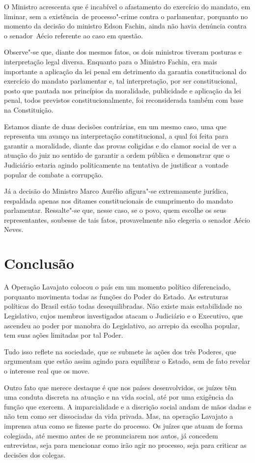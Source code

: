 O Ministro acrescenta que é incabível o afastamento do exercício do
mandato, em liminar, sem a existência~de processo"-crime contra o
parlamentar, porquanto no momento da decisão do ministro Edson Fachin,
ainda não havia denúncia contra o senador~Aécio referente ao caso em
questão.

Observe"-se que, diante dos mesmos fatos, os dois ministros tiveram
posturas e interpretação legal diversa. Enquanto para o Ministro Fachin,
era mais importante a aplicação da lei penal em detrimento da garantia
constitucional do exercício do mandato parlamentar e, tal interpretação,
por ser constitucional, posto que pautada nos princípios da moralidade,
publicidade e aplicação da lei penal, todos previstos
constitucionalmente, foi reconsiderada também com base na Constituição.

Estamos diante de duas decisões contrárias, em um mesmo caso, uma que
representa um avanço na interpretação constitucional, a qual foi feita
para garantir a moralidade, diante das provas coligidas e do clamor
social de ver a atuação do juiz no sentido de garantir a ordem pública e
demonstrar que o Judiciário estaria agindo politicamente na tentativa de
justificar a vontade popular de combate a corrupção.

Já a decisão do Ministro Marco Aurélio afigura"-se extremamente jurídica,
respaldada apenas nos ditames constitucionais de cumprimento do mandato
parlamentar. Ressalte"-se que, nesse caso, se o povo, quem escolhe os
seus representantes, soubesse de tais fatos, provavelmente não elegeria
o senador Aécio Neves.

\section{Conclusão}

A Operação Lavajato colocou o país em um momento político diferenciado,
porquanto movimenta todas as funções do Poder do Estado. As estruturas
políticas do Brasil estão todas desequilibradas. Não existe mais
estabilidade no Legislativo, cujos membros investigados atacam o
Judiciário e o Executivo, que ascendeu ao poder por manobra do
Legislativo, ao arrepio da escolha popular, tem suas ações limitadas por
tal Poder.

Tudo isso reflete na sociedade, que se submete às ações dos três
Poderes, que argumentam que estão assim agindo para equilibrar o Estado,
sem de fato revelar o interesse real que os move.

Outro fato que merece destaque é que nos países desenvolvidos, os juízes
têm uma conduta discreta na atuação e na vida social, até por uma
exigência da função que exercem. A imparcialidade e a discrição social
andam de mãos dadas e não tem como ser dissociadas da vida privada. Mas,
na operação Lavajato a imprensa atua como se fizesse parte do processo.
Os juízes que atuam de forma colegiada, até mesmo antes de se
pronunciarem nos autos, já concedem entrevistas, seja para mencionar
como irão agir no processo, seja para criticar as decisões dos colegas.


